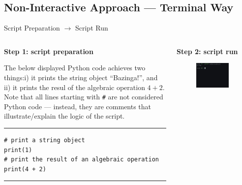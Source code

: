 \documentclass[aspectratio=1610]{beamer}
\begin{document}
\subsection{Non-Interactive Approach --- Terminal Way}

\begin{frame}[t]{Script Preparation $\rightarrow$ Script Run}
	\begin{columns}[t]
		\begin{column}{0.5\textwidth}		
		\textbf{Step 1: script preparation}	
		
		\vspace{1em}
		
		The below displayed Python code achieves two things:i) it prints the string object ``Bazinga!'', and ii) it prints the resul of the algebraic operation $4 + 2$. Note that all lines starting with \texttt{\#} are not considered Python code --- instead, they are comments that illustrate/explain the logic of the script.
		
		\rule{\textwidth}{1pt}
		\scriptsize
\begin{verbatim}
# print a string object
print(1)
# print the result of an algebraic operation
print(4 + 2)
\end{verbatim}
		\rule{\textwidth}{1pt}

		\end{column}
		\begin{column}{0.5\textwidth}
		\textbf{Step 2: script run}	
		
		\vspace{1em}
		
	\begin{figure}
		\includegraphics[width=0.9\textwidth]{images/simple_script}
	\end{figure}
		\end{column}
	\end{columns}
\end{frame}
\end{document}
